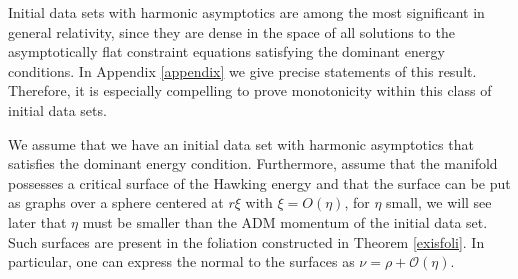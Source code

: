 \documentclass[12pt,a4paper]{amsart}
\theoremstyle{plain}
\theoremstyle{definition}
\begin{document}
 Initial data sets with harmonic asymptotics are among the most  significant in general relativity, since they are dense in the space of all solutions to the asymptotically flat constraint equations satisfying the dominant energy conditions. In Appendix \ref{appendix} we give precise statements of this result. Therefore, it is especially compelling to prove monotonicity within this class of initial data sets.


We assume that we have an initial data set with harmonic asymptotics that satisfies the dominant energy condition. Furthermore, assume that the manifold possesses a critical surface of the Hawking energy and that the surface can be put as graphs over a sphere centered at $r \xi$ with $\xi=O(\eta)$, for $\eta$ small, we will see later that $\eta$ must be smaller than the ADM momentum of the initial data set.  Such surfaces are present in the foliation constructed in Theorem \ref{exisfoli}. In particular, one can express the normal to the surfaces as $\nu= \rho +\mathcal{O}(\eta)$.
\end{document}
